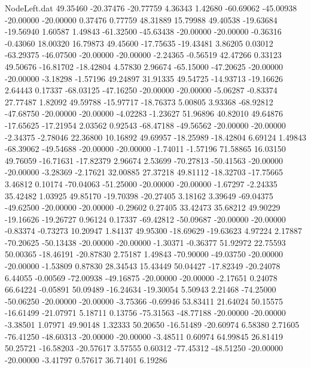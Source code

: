 \begin{filecontents}{NodeLeft.dat}
  49.35460  -20.37476  -20.77759     4.36343    1.42680  -60.69062  -45.00938  -20.00000  -20.00000    0.37476    0.77759   48.31889   15.79988
  49.40538  -19.63684  -19.56940     1.60587    1.49843  -61.32500  -45.63438  -20.00000  -20.00000   -0.36316   -0.43060   18.00320   16.79873
  49.45600  -17.75635  -19.43481     3.86205    0.03012  -63.29375  -46.07500  -20.00000  -20.00000   -2.24365   -0.56519   42.47266    0.33123
  49.50676  -16.81702  -18.42804     4.57830    2.96674  -65.15000  -47.20625  -20.00000  -20.00000   -3.18298   -1.57196   49.24897   31.91335
  49.54725  -14.93713  -19.16626     2.64443    0.17337  -68.03125  -47.16250  -20.00000  -20.00000   -5.06287   -0.83374   27.77487    1.82092
  49.59788  -15.97717  -18.76373     5.00805    3.93368  -68.92812  -47.68750  -20.00000  -20.00000   -4.02283   -1.23627   51.96896   40.82010
  49.64876  -17.65625  -17.21954     2.03562    0.92543  -68.47188  -49.56562  -20.00000  -20.00000   -2.34375   -2.78046   22.36800   10.16892
  49.69957  -18.25989  -18.42804     6.69124    1.49843  -68.39062  -49.54688  -20.00000  -20.00000   -1.74011   -1.57196   71.58865   16.03150
  49.76059  -16.71631  -17.82379     2.96674    2.53699  -70.27813  -50.41563  -20.00000  -20.00000   -3.28369   -2.17621   32.00885   27.37218
  49.81112  -18.32703  -17.75665     3.46812    0.10174  -70.04063  -51.25000  -20.00000  -20.00000   -1.67297   -2.24335   35.42482    1.03925
  49.85170  -19.70398  -20.27405     3.18162    3.39649  -69.04375  -49.62500  -20.00000  -20.00000   -0.29602    0.27405   33.42473   35.68212
  49.90229  -19.16626  -19.26727     0.96124    0.17337  -69.42812  -50.09687  -20.00000  -20.00000   -0.83374   -0.73273   10.20947    1.84137
  49.95300  -18.69629  -19.63623     4.97224    2.17887  -70.20625  -50.13438  -20.00000  -20.00000   -1.30371   -0.36377   51.92972   22.75593
  50.00365  -18.46191  -20.87830     2.75187    1.49843  -70.90000  -49.03750  -20.00000  -20.00000   -1.53809    0.87830   28.34543   15.43449
  50.04427  -17.82349  -20.24078     6.44055   -0.00569  -72.00938  -49.16875  -20.00000  -20.00000   -2.17651    0.24078   66.64224   -0.05891
  50.09489  -16.24634  -19.30054     5.50943    2.21468  -74.25000  -50.06250  -20.00000  -20.00000   -3.75366   -0.69946   53.83411   21.64024
  50.15575  -16.61499  -21.07971     5.18711    0.13756  -75.31563  -48.77188  -20.00000  -20.00000   -3.38501    1.07971   49.90148    1.32333
  50.20650  -16.51489  -20.60974     6.58380    2.71605  -76.41250  -48.60313  -20.00000  -20.00000   -3.48511    0.60974   64.99845   26.81419
  50.25721  -16.58203  -20.57617     3.57555    0.60312  -77.45312  -48.51250  -20.00000  -20.00000   -3.41797    0.57617   36.71401    6.19286

\end{filecontents}
